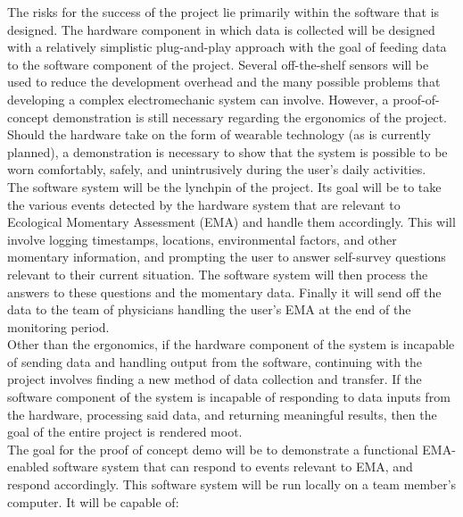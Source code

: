 \documentclass{article}
\begin{document}
The risks for the success of the project lie primarily within the software that is designed. The hardware component in which data is collected will be designed with a relatively simplistic plug-and-play approach with the goal of feeding data to the software component of the project. Several off-the-shelf sensors will be used to reduce the development overhead and the many possible problems that developing a complex electromechanic system can involve. However, a proof-of-concept demonstration is still necessary regarding the ergonomics of the project. Should the hardware take on the form of wearable technology (as is currently planned), a demonstration is necessary to show that the system is possible to be worn comfortably, safely, and unintrusively during the user's daily activities.\\

The software system will be the lynchpin of the project. Its goal will be to take the various events detected by the hardware system that are relevant to Ecological Momentary Assessment (EMA) and handle them accordingly. This will involve logging timestamps, locations, environmental factors, and other momentary information, and prompting the user to answer self-survey questions relevant to their current situation. The software system will then process the answers to these questions and the momentary data. Finally it will send off the data to the team of physicians handling the user's EMA at the end of the monitoring period.\\

Other than the ergonomics, if the hardware component of the system is incapable of sending data and handling output from the software, continuing with the project involves finding a new method of data collection and transfer. If the software component of the system is incapable of responding to data inputs from the hardware, processing said data, and returning meaningful results, then the goal of the entire project is rendered moot.\\

The goal for the proof of concept demo will be to demonstrate a functional EMA-enabled software system that can respond to events relevant to EMA, and respond accordingly. This software system will be run locally on a team member's computer. It will be capable of:\\
\end{document}
